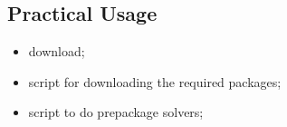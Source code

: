 \subsection{Practical Usage}
\begin{itemize}
\item download;
\item script for downloading the required packages; 
\item script to do prepackage solvers;
\end{itemize}

